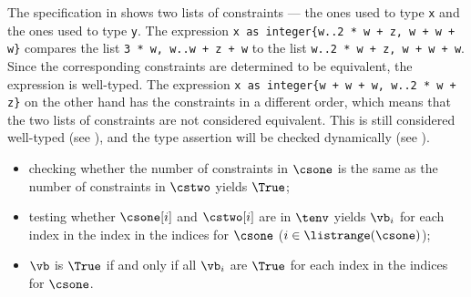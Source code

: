The specification in 
shows two lists of constraints --- the ones used to type \verb|x| and the ones used to type \verb|y|.
The expression \verb|x as integer{w..2 * w + z, w + w + w}|
compares the list \verb|3 * w, w..w + z + w| to the list \verb|w..2 * w + z, w + w + w|.
Since the corresponding constraints are determined to be equivalent,
the expression is well-typed.
The expression \verb|x as integer{w + w + w, w..2 * w + z}| on the other hand
has the constraints in a different order, which means that the two lists of constraints
are not considered equivalent. This is still considered well-typed (see ),
and the type assertion will be checked dynamically (see ).

\ProseParagraph
\AllApply
\begin{itemize}
  \item checking whether the number of constraints in $\csone$ is the same as the number of constraints in $\cstwo$
        yields $\True$\ProseTerminateAs{\False};
  \item testing whether $\csone[i]$ and $\cstwo[i]$ are \equivalentconstraintsterm{} in $\tenv$
        yields $\vb_i$ for each index in the index in the indices for $\csone$ ($i\in\listrange(\csone)$)\ProseOrTypeError;
  \item $\vb$ is $\True$ if and only if all $\vb_i$ are $\True$ for each index in the indices for $\csone$.
\end{itemize}

\FormallyParagraph
\begin{mathpar}
\end{mathpar}


